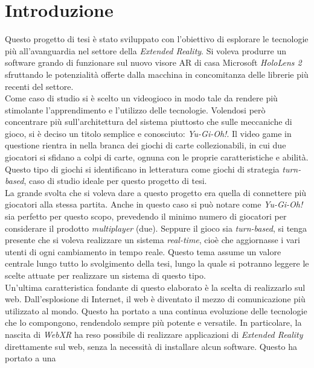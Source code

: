 \chapter{Introduzione}

Questo progetto di tesi è stato sviluppato con l'obiettivo di esplorare le tecnologie più all'avanguardia nel settore della \textit{Extended Reality}. Si voleva produrre un software
grando di funzionare sul nuovo visore AR di casa Microsoft \textit{HoloLens 2} sfruttando le potenzialità offerte dalla macchina in concomitanza delle librerie più recenti
del settore.\\
\newline
Come caso di studio si è scelto un videogioco in modo tale da rendere più stimolante l'apprendimento e l'utilizzo delle tecnologie. Volendosi però concentrare più sull'architettura
del sistema piuttosto che sulle meccaniche di gioco, si è deciso un titolo semplice e conosciuto: \textit{Yu-Gi-Oh!}. Il video game in questione rientra in nella branca dei giochi di
carte collezionabili, in cui due giocatori si sfidano a colpi di carte, ognuna con le proprie caratteristiche e abilità. Questo tipo di giochi si identificano in letteratura come
giochi di strategia \textit{turn-based}, caso di studio ideale per questo progetto di tesi.\\
\newline
La grande svolta che si voleva dare a questo progetto era quella di connettere più giocatori alla stessa partita. Anche in questo caso si può notare come \textit{Yu-Gi-Oh!} sia 
perfetto per questo scopo, prevedendo il minimo numero di giocatori per considerare il prodotto \textit{multiplayer} (due). Seppure il gioco sia \textit{turn-based}, si tenga presente
che si voleva realizzare un sistema \textit{real-time}, cioè che aggiornasse i vari utenti di ogni cambiamento in tempo reale. Questo tema assume un valore centrale lungo tutto lo
svolgimento della tesi, lungo la quale si potranno leggere le scelte attuate per realizzare un sistema di questo tipo.\\
\newline
Un'ultima caratteristica fondante di questo elaborato è la scelta di realizzarlo sul web. Dall'esplosione di Internet, il web è diventato il mezzo di comunicazione più utilizzato
al mondo. Questo ha portato a una continua evoluzione delle tecnologie che lo compongono, rendendolo sempre più potente e versatile. In particolare, la nascita di \textit{WebXR} ha
reso possibile di realizzare applicazioni di \textit{Extended Reality} direttamente sul web, senza la necessità di installare alcun software. Questo ha portato a una
